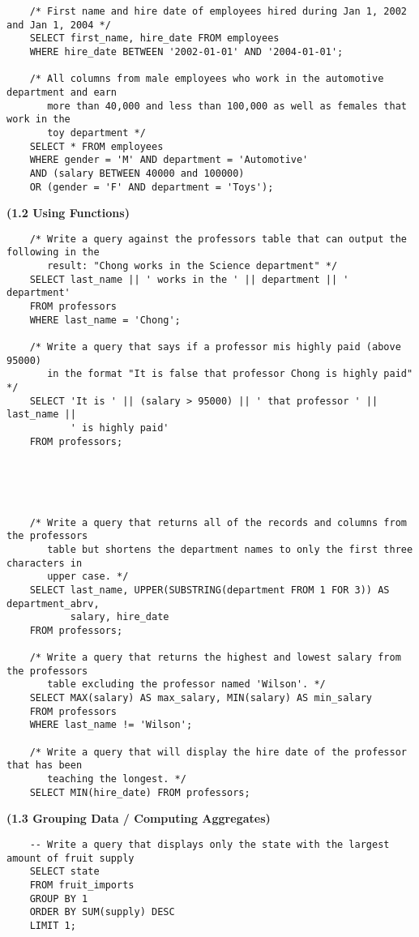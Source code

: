 \documentclass[11pt, a4paper]{article}
\begin{document}
\begin{spacing}{1.1}
\begin{lstlisting}
	/* First name and hire date of employees hired during Jan 1, 2002 and Jan 1, 2004 */
	SELECT first_name, hire_date FROM employees
	WHERE hire_date BETWEEN '2002-01-01' AND '2004-01-01';
	
	/* All columns from male employees who work in the automotive department and earn 
	   more than 40,000 and less than 100,000 as well as females that work in the 
	   toy department */
	SELECT * FROM employees
	WHERE gender = 'M' AND department = 'Automotive' 
	AND (salary BETWEEN 40000 and 100000) 
	OR (gender = 'F' AND department = 'Toys'); \end{lstlisting} \vspace*{5mm}
	\large \textbf{(1.2 Using Functions)} \normalsize
	\begin{lstlisting}
	/* Write a query against the professors table that can output the following in the 
	   result: "Chong works in the Science department" */
	SELECT last_name || ' works in the ' || department || ' department'
	FROM professors
	WHERE last_name = 'Chong';
		
	/* Write a query that says if a professor mis highly paid (above 95000)
	   in the format "It is false that professor Chong is highly paid" */
	SELECT 'It is ' || (salary > 95000) || ' that professor ' || last_name || 
	       ' is highly paid'
	FROM professors;
	
	
	
	
	
	/* Write a query that returns all of the records and columns from the professors 
	   table but shortens the department names to only the first three characters in 
	   upper case. */
	SELECT last_name, UPPER(SUBSTRING(department FROM 1 FOR 3)) AS department_abrv, 
	       salary, hire_date
	FROM professors;
	
	/* Write a query that returns the highest and lowest salary from the professors 
	   table excluding the professor named 'Wilson'. */
	SELECT MAX(salary) AS max_salary, MIN(salary) AS min_salary
	FROM professors
	WHERE last_name != 'Wilson';
	
	/* Write a query that will display the hire date of the professor that has been 
	   teaching the longest. */
	SELECT MIN(hire_date) FROM professors; \end{lstlisting} \vspace*{5mm}
	\noindent \large \textbf{(1.3 Grouping Data / Computing Aggregates)} \normalsize
	\begin{lstlisting}
	-- Write a query that displays only the state with the largest amount of fruit supply
	SELECT state
	FROM fruit_imports
	GROUP BY 1
	ORDER BY SUM(supply) DESC
	LIMIT 1;
		

\end{lstlisting}
\end{spacing}
\end{document}
